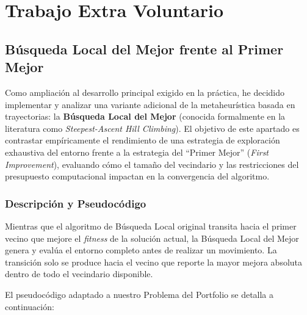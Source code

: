 \newpage
\section{Trabajo Extra Voluntario}
\label{sec:trabajo_extra}


\subsection{Búsqueda Local del Mejor frente al Primer Mejor}

Como ampliación al desarrollo principal exigido en la práctica, he decidido implementar y analizar una variante adicional de la metaheurística basada en trayectorias: la \textbf{Búsqueda Local del Mejor} (conocida formalmente en la literatura como \textit{Steepest-Ascent Hill Climbing}). El objetivo de este apartado es contrastar empíricamente el rendimiento de una estrategia de exploración exhaustiva del entorno frente a la estrategia del ``Primer Mejor'' (\textit{First Improvement}), evaluando cómo el tamaño del vecindario y las restricciones del presupuesto computacional impactan en la convergencia del algoritmo.

\subsubsection{Descripción y Pseudocódigo}
Mientras que el algoritmo de Búsqueda Local original transita hacia el primer vecino que mejore el \textit{fitness} de la solución actual, la Búsqueda Local del Mejor genera y evalúa el entorno completo antes de realizar un movimiento. La transición solo se produce hacia el vecino que reporte la mayor mejora absoluta dentro de todo el vecindario disponible.

El pseudocódigo adaptado a nuestro Problema del Portfolio se detalla a continuación:

